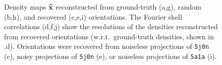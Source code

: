 \begin{figure}[t]
\begin{subfigure}[b]{0.31\linewidth}
        \caption{}
    \end{subfigure}
    \caption{%
        Density maps $\widehat{\mathbf{x}}$ reconstructed from ground-truth (a,g), random (b,h), and recovered (c,e,i) orientations.
        The Fourier shell correlations (d,f,j) show the resolutions of the densities reconstructed from recovered orientations (w.r.t.\ ground-truth densities, shown in ,d).
        Orientations were recovered from noiseless projections of \texttt{5j0n} (c), noisy projections of \texttt{5j0n} (e), or noiseless projections of \texttt{5a1a} (i).
    }\label{fig:reconstructions}
\end{figure}





